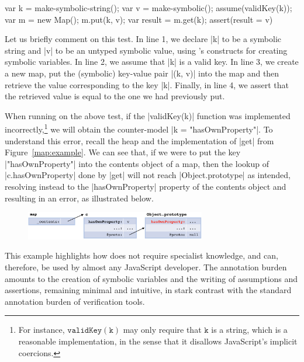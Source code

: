 \begin{lstjs}
var k = make-symbolic-string(); var v = make-symbolic();
assume(validKey(k));
var m = new Map(); m.put(k, v); var result = m.get(k);  
assert(result = v)
\end{lstjs}

Let us briefly comment on this test. In line 1, we declare \jsinline|k| to be a symbolic string and \jsinline|v| to be an untyped symbolic value, using \jilette's constructs for creating symbolic variables. In line 2, we assume that \jsinline|k| is a valid key. In line 3, we create a new map, put the (symbolic) key-value pair \jsinline|(k, v)| into the map and then retrieve the value corresponding to the key \jsinline|k|. Finally, in line 4, we assert that the retrieved value is equal to the one we had previously put.

% 
When running \jilette on the above test, if the \jsinline|validKey(k)| function was implemented incorrectly,\footnote{For instance, $\mathtt{validKey(k)}$ may only require that $\mathtt{k}$ is a string, which is a reasonable implementation, in the sense that it disallows JavaScript's implicit coercions.}
we will obtain the counter-model \jsinline|k = "hasOwnProperty"|. To understand this error, recall the heap and the implementation of \jsinline|get| from Figure~\ref{map:example}. We can see that, if we were to put the key \jsinline|"hasOwnProperty"| into the contents object of a map, then the lookup of \jsinline|c.hasOwnProperty| done by \jsinline|get| will not reach \jsinline|Object.prototype| as intended, resolving instead to the \jsinline|hasOwnProperty| property of the contents object and resulting in an error, as illustrated below.

\vspace{-0.2cm}
\begin{figure}[h!]
\centering
\includegraphics[width=0.7\textwidth]{figures/heapfail.png}
\vspace{-0.2cm}
\end{figure}

This example highlights how \jilette does not require specialist knowledge, and can, therefore, 
be used by almost any JavaScript developer. The annotation burden amounts to the creation of 
symbolic variables and the writing of assumptions and assertions, remaining minimal and intuitive, in stark contrast  with the standard annotation burden of verification tools.


